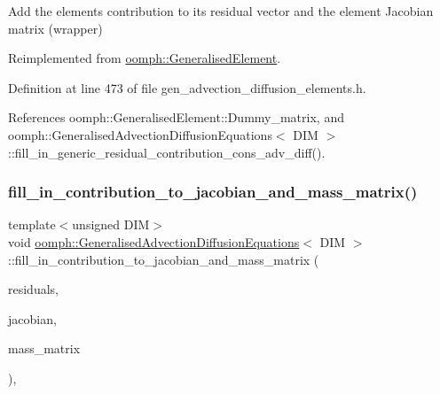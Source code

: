 Add the element\textquotesingle{}s contribution to its residual vector and the element Jacobian matrix (wrapper) 



Reimplemented from \hyperlink{classoomph_1_1GeneralisedElement_a6ae09fc0d68e4309ac1b03583d252845}{oomph\+::\+Generalised\+Element}.



Definition at line 473 of file gen\+\_\+advection\+\_\+diffusion\+\_\+elements.\+h.



References oomph\+::\+Generalised\+Element\+::\+Dummy\+\_\+matrix, and oomph\+::\+Generalised\+Advection\+Diffusion\+Equations$<$ D\+I\+M $>$\+::fill\+\_\+in\+\_\+generic\+\_\+residual\+\_\+contribution\+\_\+cons\+\_\+adv\+\_\+diff().

\mbox{\label{classoomph_1_1GeneralisedAdvectionDiffusionEquations_a773339fec529d9779bb88146a4e9c641}} 
\subsubsection{\texorpdfstring{fill\+\_\+in\+\_\+contribution\+\_\+to\+\_\+jacobian\+\_\+and\+\_\+mass\+\_\+matrix()}{fill\_in\_contribution\_to\_jacobian\_and\_mass\_matrix()}}
{\footnotesize\ttfamily template$<$unsigned D\+IM$>$ \\
void \hyperlink{classoomph_1_1GeneralisedAdvectionDiffusionEquations}{oomph\+::\+Generalised\+Advection\+Diffusion\+Equations}$<$ D\+IM $>$\+::fill\+\_\+in\+\_\+contribution\+\_\+to\+\_\+jacobian\+\_\+and\+\_\+mass\+\_\+matrix (\begin{DoxyParamCaption}\item[{\hyperlink{classoomph_1_1Vector}{Vector}$<$ double $>$ \&}]{residuals,  }\item[{\hyperlink{classoomph_1_1DenseMatrix}{Dense\+Matrix}$<$ double $>$ \&}]{jacobian,  }\item[{\hyperlink{classoomph_1_1DenseMatrix}{Dense\+Matrix}$<$ double $>$ \&}]{mass\+\_\+matrix }\end{DoxyParamCaption})\hspace{0.3cm}{\ttfamily [inline]}, {\ttfamily [virtual]}}

